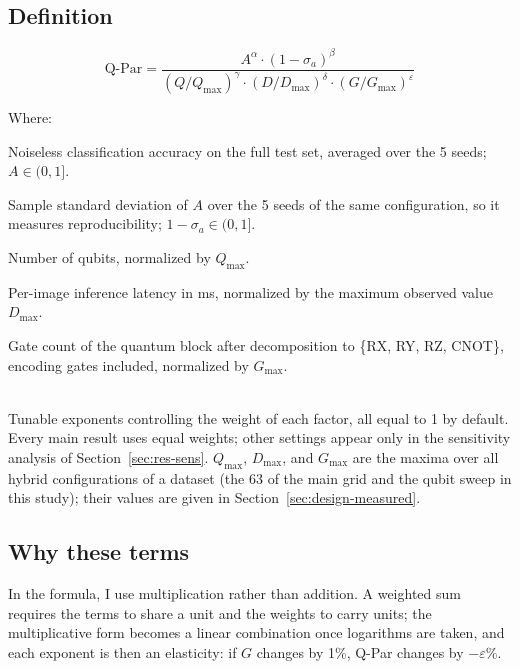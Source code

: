 \documentclass{ieeeaccess}
\newcommand{\QP}{\text{Q-Par}}                %
\begin{document}
\subsection{Definition}
\label{sec:qpar-def}

\begin{equation}
\QP = \frac{A^{\alpha}\cdot(1-\sigma_a)^{\beta}}{(Q/Q_{\max})^{\gamma}\cdot(D/D_{\max})^{\delta}\cdot(G/G_{\max})^{\varepsilon}}
\label{eq:qpar}
\end{equation}

\noindent Where:
\begin{IEEEdescription}
\item[$A$] Noiseless classification accuracy on the full test set, averaged over the 5 seeds; $A \in (0, 1]$.
\item[$\sigma_a$] Sample standard deviation of $A$ over the 5 seeds of the same configuration, so it measures reproducibility; $1-\sigma_a \in (0, 1]$.
\item[$Q$] Number of qubits, normalized by $Q_{\max}$.
\item[$D$] Per-image inference latency in ms, normalized by the maximum observed value $D_{\max}$.
\item[$G$] Gate count of the quantum block after decomposition to \{RX, RY, RZ, CNOT\}, encoding gates included, normalized by $G_{\max}$.
\item[\rlap{$\alpha, \beta, \gamma, \delta, \varepsilon$}] \mbox{}\\ Tunable exponents controlling the weight of each factor, all equal to 1 by default. Every main result uses equal weights; other settings appear only in the sensitivity analysis of Section~\ref{sec:res-sens}. $Q_{\max}$, $D_{\max}$, and $G_{\max}$ are the maxima over all hybrid configurations of a dataset (the 63 of the main grid and the qubit sweep in this study); their values are given in Section~\ref{sec:design-measured}.
\end{IEEEdescription}

\subsection{Why these terms}
\label{sec:qpar-why}

In the formula, I use multiplication rather than addition. A weighted sum requires the terms to share a unit and the weights to carry units; the multiplicative form becomes a linear combination once logarithms are taken, and each exponent is then an elasticity: if $G$ changes by 1\%, Q-Par changes by $-\varepsilon$\%.
\end{document}
